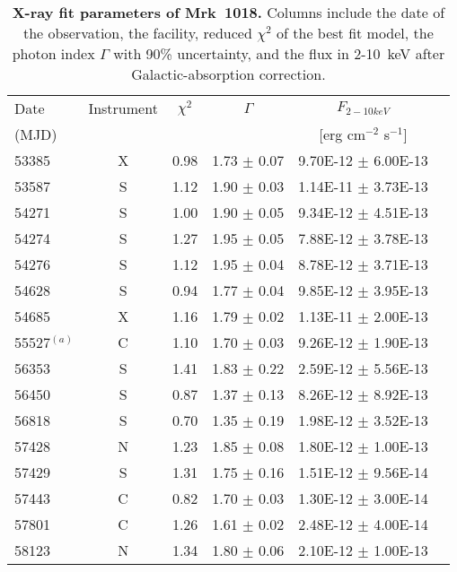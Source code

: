 \begin{table*}
\centering
\caption{{ \bf X-ray fit parameters of Mrk~1018. } Columns include the date of the observation, the facility, reduced $\chi ^2$ of the best fit model, the photon index $\Gamma$ with 90\% uncertainty, and the flux in 2-10~keV after Galactic-absorption correction. }
\label{tab:table1}

\begin{tabular}{lccccc}
\hline
\hline
 
  Date   &   Instrument  & $\chi ^2$  &$\Gamma$  &  $F_{2-10keV}$  & \\ 
  (MJD)  &                         &                      &                    &  [erg cm$^{-2}$ s$^{-1}$] &      
 \\  \hline

53385 & X & 0.98 & 1.73  $\pm$  0.07 & 9.70E-12  $\pm$  6.00E-13 &  \\ 
53587 & S & 1.12 & 1.90  $\pm$  0.03 & 1.14E-11  $\pm$  3.73E-13 &  \\ 
54271 & S & 1.00 & 1.90  $\pm$  0.05 & 9.34E-12  $\pm$  4.51E-13 &  \\ 
54274 & S & 1.27 & 1.95  $\pm$  0.05 & 7.88E-12  $\pm$  3.78E-13 &  \\ 
54276 & S & 1.12 & 1.95  $\pm$  0.04 & 8.78E-12  $\pm$  3.71E-13 &  \\ 
54628 & S & 0.94 & 1.77  $\pm$  0.04 & 9.85E-12  $\pm$  3.95E-13 &  \\ 
54685 & X & 1.16 & 1.79  $\pm$  0.02 & 1.13E-11  $\pm$  2.00E-13 &  \\ 
55527$^{(a)}$ & C & 1.10 & 1.70  $\pm$  0.03 & 9.26E-12  $\pm$  1.90E-13 &            \\ 
56353 & S & 1.41 & 1.83  $\pm$  0.22 & 2.59E-12  $\pm$  5.56E-13 &  \\ 
56450 & S & 0.87 & 1.37  $\pm$  0.13 & 8.26E-12  $\pm$  8.92E-13 &  \\ 
56818 & S & 0.70 & 1.35  $\pm$  0.19 & 1.98E-12  $\pm$  3.52E-13 &  \\ 
57428 & N & 1.23 & 1.85  $\pm$  0.08 & 1.80E-12  $\pm$  1.00E-13 &  \\ 
57429 & S & 1.31 & 1.75  $\pm$  0.16 & 1.51E-12  $\pm$  9.56E-14 &  \\ 
57443 & C & 0.82 & 1.70  $\pm$  0.03 & 1.30E-12  $\pm$  3.00E-14 &  \\ 
57801 & C & 1.26 & 1.61  $\pm$  0.02 & 2.48E-12  $\pm$  4.00E-14 &  \\ 
58123 & N & 1.34 & 1.80  $\pm$  0.06 & 2.10E-12  $\pm$  1.00E-13 &  \\ 

\end{tabular}
\end{table*}
